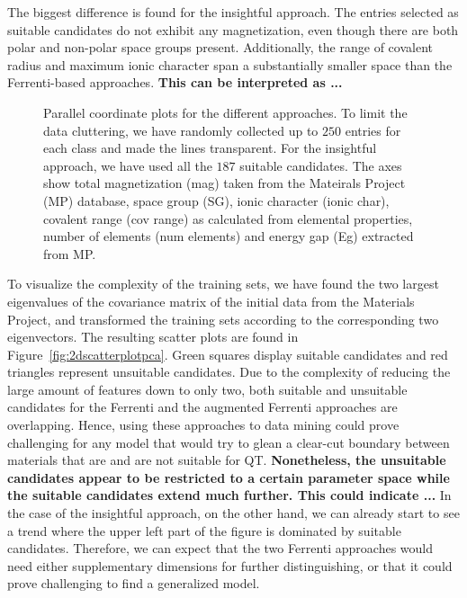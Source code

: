 \documentclass[superscriptaddress,unsortedaddress,
 amsmath,amssymb,
 aps,
]{revtex4-2}
\begin{document}
The biggest difference is found for the insightful approach. The entries selected as suitable candidates do not exhibit any magnetization, even though there are both polar and non-polar space groups present. Additionally, the range of covalent radius and maximum ionic character span a substantially smaller space than the Ferrenti-based approaches. 
\textbf{This can be interpreted as ... }

\begin{figure}[t] %
    \centering
    \begin{subfigure}{1\textwidth}
        \centering
          
    \end{subfigure}
    \begin{subfigure}{1\textwidth}
        \centering
          
    \end{subfigure}
    \begin{subfigure}{1\textwidth}
        \centering
          
    \end{subfigure}
    \vspace*{-95mm}
    \caption{Parallel coordinate plots for the different approaches. To limit the data cluttering, we have randomly collected up to $250$ entries for each class and made the lines transparent. For the insightful approach, we have used all the $187$ suitable candidates. The axes show total magnetization (mag) taken from the Mateirals Project (MP) database, space group (SG), ionic character (ionic char), covalent range (cov range) as calculated from elemental properties, number of elements (num elements) and energy gap (Eg) extracted from MP.} 
    \label{fig:parallel-coordinates-approaches}
\end{figure}

To visualize the complexity of the training sets, we have found the two largest eigenvalues of the covariance matrix of the initial data from the Materials Project, and transformed the training sets according to the corresponding two eigenvectors. The resulting scatter plots are found in Figure~\ref{fig:2dscatterplotpca}. 
Green squares display suitable candidates and red triangles represent unsuitable candidates. 
Due to the 
complexity 
of reducing the large amount of features down to only two, both suitable and unsuitable candidates for the Ferrenti and the augmented Ferrenti approaches are overlapping. 
Hence, using these approaches to data mining could prove challenging for any model that would try to glean a clear-cut boundary between materials that are and are not suitable for QT. 
\textbf{Nonetheless, the unsuitable candidates appear to be restricted to a certain parameter space while the suitable candidates extend much further. This could indicate ... } 
In the case of the insightful approach, on the other hand, we can already start to see a trend where the upper left part of the figure is dominated by suitable candidates. Therefore, we can expect that the two Ferrenti approaches would need either supplementary dimensions for further distinguishing, or that it could prove challenging to find a generalized model. 
\end{document}
